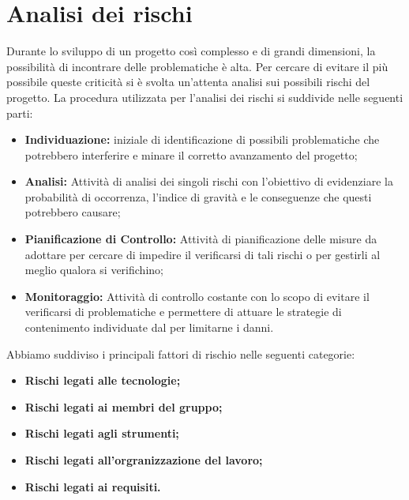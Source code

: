 \section{Analisi dei rischi}
\label{analisi_dei_rischi}
Durante lo sviluppo di un progetto così complesso e di grandi dimensioni, la possibilità di incontrare delle problematiche è alta. Per cercare di evitare il più possibile queste criticità si è svolta un'attenta analisi sui possibili rischi del progetto. La procedura utilizzata per l'analisi dei rischi si suddivide nelle seguenti parti:
\begin{itemize}
    \item \textbf{Individuazione:}  iniziale di identificazione di possibili problematiche che potrebbero interferire e minare il corretto avanzamento del progetto;
    \item \textbf{Analisi:} Attività di analisi dei singoli rischi con l'obiettivo di evidenziare la probabilità di occorrenza, l'indice di gravità e le conseguenze che  questi potrebbero causare;
    \item \textbf{Pianificazione di Controllo:} Attività di pianificazione delle misure da adottare per cercare di impedire il verificarsi di tali rischi o per gestirli al meglio qualora si verifichino;
    \item \textbf{Monitoraggio:} Attività di controllo costante con lo scopo di evitare il verificarsi di problematiche e permettere di attuare le strategie di contenimento individuate dal  per limitarne i danni.
\end{itemize}

Abbiamo suddiviso i principali fattori di rischio nelle seguenti categorie:
\begin{itemize}
    \item \textbf{Rischi legati alle tecnologie;}
    \item \textbf{Rischi legati ai membri del gruppo;}
    \item \textbf{Rischi legati agli strumenti;}
    \item \textbf{Rischi legati all'orgranizzazione del lavoro;}
    \item \textbf{Rischi legati ai requisiti.}
\end{itemize}

\renewcommand{\arraystretch}{1.5}

\newpage


\newpage


\newpage


\newpage


\newpage
